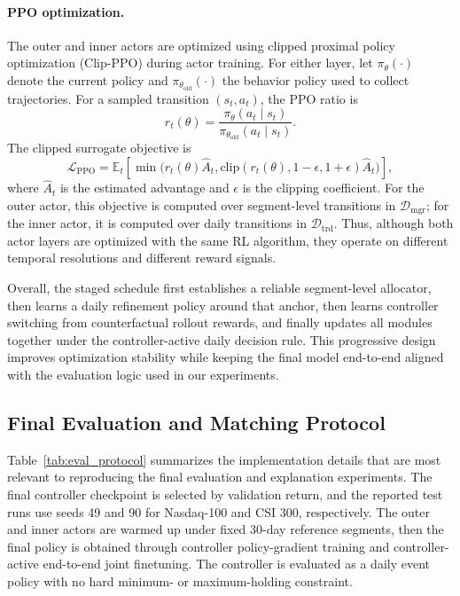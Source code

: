 \documentclass[letterpaper]{article} %
\begin{document}
\paragraph{PPO optimization.}
The outer and inner actors are optimized using clipped proximal policy optimization (Clip-PPO) during actor training. For either layer, let \(\pi_{\theta}(\cdot)\) denote the current policy and \(\pi_{\theta_{\mathrm{old}}}(\cdot)\) the behavior policy used to collect trajectories. For a sampled transition \((s_t,a_t)\), the PPO ratio is
\[
r_t(\theta)
=
\frac{\pi_{\theta}(a_t\mid s_t)}
{\pi_{\theta_{\mathrm{old}}}(a_t\mid s_t)}.
\]
The clipped surrogate objective is
\[
\mathcal{L}_{\mathrm{PPO}}
=
\mathbb{E}_t\!\left[
\min\!\bigl(
r_t(\theta)\hat{A}_t,
\mathrm{clip}(r_t(\theta),1-\epsilon,1+\epsilon)\hat{A}_t
\bigr)
\right],
\]
where \(\hat{A}_t\) is the estimated advantage and \(\epsilon\) is the clipping coefficient. For the outer actor, this objective is computed over segment-level transitions in \(\mathcal{D}_{\mathrm{mgr}}\); for the inner actor, it is computed over daily transitions in \(\mathcal{D}_{\mathrm{trd}}\). Thus, although both actor layers are optimized with the same RL algorithm, they operate on different temporal resolutions and different reward signals.

Overall, the staged schedule first establishes a reliable segment-level allocator, then learns a daily refinement policy around that anchor, then learns controller switching from counterfactual rollout rewards, and finally updates all modules together under the controller-active daily decision rule. This progressive design improves optimization stability while keeping the final model end-to-end aligned with the evaluation logic used in our experiments.

\subsection{Final Evaluation and Matching Protocol}
\label{app:eval_protocol}

Table~\ref{tab:eval_protocol} summarizes the implementation details that are most relevant to reproducing the final evaluation and explanation experiments. The final controller checkpoint is selected by validation return, and the reported test runs use seeds 49 and 90 for Nasdaq-100 and CSI 300, respectively. The outer and inner actors are warmed up under fixed 30-day reference segments, then the final policy is obtained through controller policy-gradient training and controller-active end-to-end joint finetuning. The controller is evaluated as a daily event policy with no hard minimum- or maximum-holding constraint.
\end{document}
